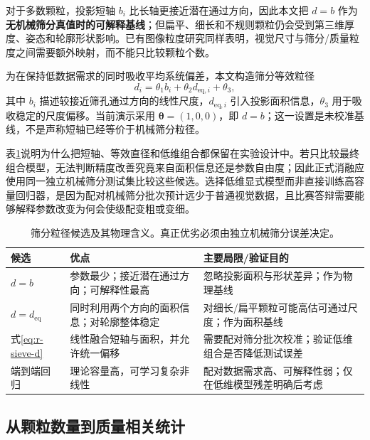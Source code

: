 对于多数颗粒，投影短轴 $b_i$ 比长轴更接近潜在通过方向，因此本文把 $d=b$ 作为\textbf{无机械筛分真值时的可解释基线}；但扁平、细长和不规则颗粒仍会受到第三维厚度、姿态和轮廓形状影响。已有图像粒度研究同样表明，视觉尺寸与筛分/质量粒度之间需要额外映射，而不能只比较颗粒个数\cite{maiti2017massModel,mair2023automated}。

为在保持低数据需求的同时吸收平均系统偏差，本文构造筛分等效粒径
\begin{equation}
 d_i=\theta_1 b_i+\theta_2 d_{\mathrm{eq},i}+\theta_3,
\label{eq:r-sieve-d}
\end{equation}
其中 $b_i$ 描述较接近筛孔通过方向的线性尺度，$d_{\mathrm{eq},i}$ 引入投影面积信息，$\theta_3$ 用于吸收稳定的尺度偏移。当前演示采用 $\boldsymbol{\theta}=(1,0,0)$，即 $d=b$；这一设置是未校准基线，不是声称短轴已经等价于机械筛分粒径。

表\ref{tab:r-diameter-candidates}说明为什么把短轴、等效直径和低维组合都保留在实验设计中。若只比较最终组合模型，无法判断精度改善究竟来自面积信息还是参数自由度；因此正式消融应使用同一独立机械筛分测试集比较这些候选。选择低维显式模型而非直接训练高容量回归器，是因为配对机械筛分批次预计远少于普通视觉数据，且比赛答辩需要能够解释参数改变为何会使级配变粗或变细。

\begin{table}[t]
\centering
\caption{筛分粒径候选及其物理含义。真正优劣必须由独立机械筛分误差决定。}
\label{tab:r-diameter-candidates}
\footnotesize
\renewcommand{\arraystretch}{1.12}
\begin{tabular}{>{\raggedright\arraybackslash}p{2.8cm}>{\raggedright\arraybackslash}p{4.6cm}>{\raggedright\arraybackslash}p{5.5cm}}
\toprule
候选 & 优点 & 主要局限/验证目的 \\
\midrule
$d=b$ & 参数最少；接近潜在通过方向；可解释性最高 & 忽略投影面积与形状差异；作为物理基线 \\
$d=d_{\mathrm{eq}}$ & 同时利用两个方向的面积信息；对轮廓整体稳定 & 对细长/扁平颗粒可能高估可通过尺度；作为面积基线 \\
式\eqref{eq:r-sieve-d} & 线性融合短轴与面积，并允许统一偏移 & 需要配对筛分批次校准；验证低维组合是否降低测试误差 \\
端到端回归 & 理论容量高，可学习复杂非线性 & 配对数据需求高、可解释性弱；仅在低维模型残差明确后考虑 \\
\bottomrule
\end{tabular}
\end{table}

\subsection{从颗粒数量到质量相关统计}

